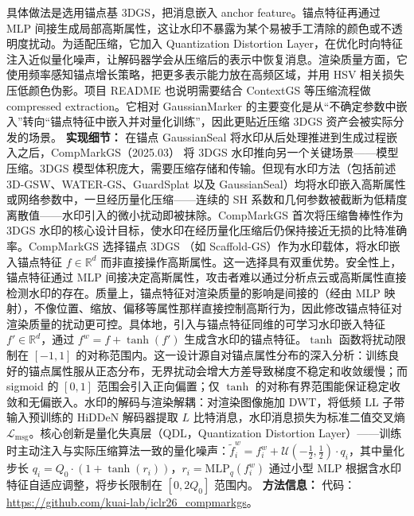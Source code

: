 具体做法是选用锚点基 3DGS，把消息嵌入 anchor feature。锚点特征再通过 MLP 间接生成局部高斯属性，这让水印不暴露为某个易被手工清除的颜色或不透明度扰动。为适配压缩，它加入 Quantization Distortion Layer，在优化时向特征注入近似量化噪声，让解码器学会从压缩后的表示中恢复消息。渲染质量方面，它使用频率感知锚点增长策略，把更多表示能力放在高频区域，并用 HSV 相关损失压低颜色伪影。项目 README 也说明需要结合 ContextGS 等压缩流程做 compressed extraction。它相对 GaussianMarker 的主要变化是从“不确定参数中嵌入”转向“锚点特征中嵌入并对量化训练”，因此更贴近压缩 3DGS 资产会被实际分发的场景。
\textbf{实现细节：} 在锚点 GaussianSeal 将水印从后处理推进到生成过程嵌入之后，CompMarkGS（2025.03） 将 3DGS 水印推向另一个关键场景——模型压缩。3DGS 模型体积庞大，需要压缩存储和传输。但现有水印方法（包括前述 3D-GSW、WATER-GS、GuardSplat 以及 GaussianSeal）均将水印嵌入高斯属性或网络参数中，一旦经历量化压缩——连续的 SH 系数和几何参数被截断为低精度离散值——水印引入的微小扰动即被抹除。CompMarkGS 首次将压缩鲁棒性作为 3DGS 水印的核心设计目标，使水印在经历量化压缩后仍保持接近无损的比特准确率。CompMarkGS 选择锚点 3DGS （如 Scaffold-GS）作为水印载体，将水印嵌入锚点特征 $f \in \mathbb{R}^d$ 而非直接操作高斯属性。这一选择具有双重优势。安全性上，锚点特征通过 MLP 间接决定高斯属性，攻击者难以通过分析点云或高斯属性直接检测水印的存在。质量上，锚点特征对渲染质量的影响是间接的（经由 MLP 映射），不像位置、缩放、偏移等属性那样直接控制高斯行为，因此修改锚点特征对渲染质量的扰动更可控。具体地，引入与锚点特征同维的可学习水印嵌入特征 $f' \in \mathbb{R}^d$，通过 $f^w = f + \tanh(f')$ 生成含水印的锚点特征。$\tanh$ 函数将扰动限制在 $[-1, 1]$ 的对称范围内。这一设计源自对锚点属性分布的深入分析：训练良好的锚点属性服从正态分布，无界扰动会增大方差导致梯度不稳定和收敛缓慢；而 sigmoid 的 $[0, 1]$ 范围会引入正向偏置；仅 $\tanh$ 的对称有界范围能保证稳定收敛和无偏嵌入。水印的解码与渲染解耦：对渲染图像施加 DWT，将低频 LL 子带输入预训练的 HiDDeN 解码器提取 $L$ 比特消息，水印消息损失为标准二值交叉熵 $\mathcal{L}_{\mathrm{msg}}$。核心创新是量化失真层（QDL，Quantization Distortion Layer）——训练时主动注入与实际压缩算法一致的量化噪声：$\tilde{f}^w_i = f^w_i + \mathcal{U}(-\frac{1}{2}, \frac{1}{2}) \cdot q_i$，其中量化步长 $q_i = Q_0 \cdot (1 + \tanh(r_i))$，$r_i = \mathrm{MLP}_q(f^w_i)$ 通过小型 MLP 根据含水印特征自适应调整，将步长限制在 $[0, 2Q_0]$ 范围内。
\textbf{方法信息：} 代码：\url{https://github.com/kuai-lab/iclr26_compmarkgs}。
